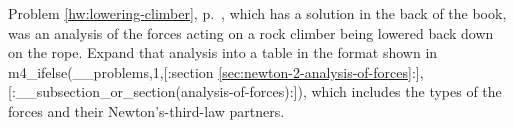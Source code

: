 Problem \ref{hw:lowering-climber}, p.~\pageref{hw:lowering-climber},
which has a solution in the back of the book, was an analysis of
the forces acting on a rock climber being lowered back down on the rope.
Expand that analysis into a table in the format shown in m4_ifelse(__problems,1,[:section \ref{sec:newton-2-analysis-of-forces}:],[:__subsection_or_section(analysis-of-forces):]),
which includes the types of the forces and their Newton's-third-law partners.
